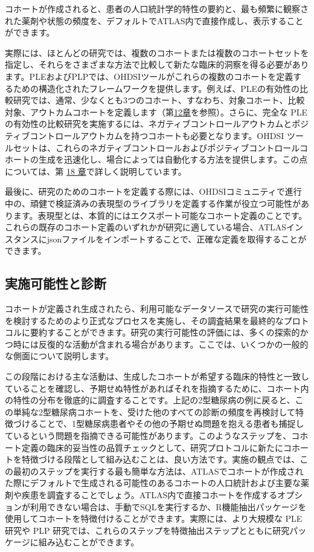 \documentclass[
  11pt]{book}
\theoremstyle{definition}
\theoremstyle{definition}
\theoremstyle{definition}
\theoremstyle{definition}
\theoremstyle{remark}
\begin{document}
コホートが作成されると、患者の人口統計学的特性の要約と、最も頻繁に観察された薬剤や状態の頻度を、デフォルトでATLAS内で直接作成し、表示することができます。

実際には、ほとんどの研究では、複数のコホートまたは複数のコホートセットを指定し、それらをさまざまな方法で比較して新たな臨床的洞察を得る必要があります。PLEおよびPLPでは、OHDSIツールがこれらの複数のコホートを定義するための構造化されたフレームワークを提供します。例えば、PLEの有効性の比較研究では、通常、少なくとも3つのコホート、すなわち、対象コホート、比較対象、アウトカムコホートを定義します（第\href{https://ohdsi.github.io/TheBookOfOhdsi/PopulationLevelEstimation.html\#PopulationLevelEstimation}{12章}を参照）。さらに、完全な PLE の有効性の比較研究を実施するには、ネガティブコントロールアウトカムとポジティブコントロールアウトカムを持つコホートも必要となります。OHDSI ツールセットは、これらのネガティブコントロールおよびポジティブコントロールコホートの生成を迅速化し、場合によっては自動化する方法を提供します。この点については、第 \href{https://ohdsi.github.io/TheBookOfOhdsi/MethodValidity.html\#MethodValidity}{18 章}で詳しく説明しています。

最後に、研究のためのコホートを定義する際には、OHDSIコミュニティで進行中の、頑健で検証済みの表現型のライブラリを定義する作業が役立つ可能性があります。表現型とは、本質的にはエクスポート可能なコホート定義のことです。これらの既存のコホート定義のいずれかが研究に適している場合、ATLASインスタンスにjsonファイルをインポートすることで、正確な定義を取得することができます。

\subsection{実施可能性と診断}\label{Feasibility}

 

コホートが定義され生成されたら、利用可能なデータソースで研究の実行可能性を検討するためのより正式なプロセスを実施し、その調査結果を最終的なプロトコルに要約することができます。研究の実行可能性の評価には、多くの探索的かつ時には反復的な活動が含まれる場合があります。ここでは、いくつかの一般的な側面について説明します。

この段階における主な活動は、生成したコホートが希望する臨床的特性と一致していることを確認し、予期せぬ特性があればそれを指摘するために、コホート内の特性の分布を徹底的に調査することです。上記の2型糖尿病の例に戻ると、この単純な2型糖尿病コホートを、受けた他のすべての診断の頻度を再検討して特徴づけることで、1型糖尿病患者やその他の予期せぬ問題を抱える患者も捕捉しているという問題を指摘できる可能性があります。このようなステップを、コホート定義の臨床的妥当性の品質チェックとして、研究プロトコルに新たにコホートを特徴づける段階として組み込むことは、良い方法です。実施の観点では、この最初のステップを実行する最も簡単な方法は、ATLASでコホートが作成された際にデフォルトで生成される可能性のあるコホートの人口統計および主要な薬剤や疾患を調査することでしょう。ATLAS内で直接コホートを作成するオプションが利用できない場合は、手動でSQLを実行するか、R機能抽出パッケージを使用してコホートを特徴付けることができます。実際には、より大規模な PLE 研究や PLP 研究では、これらのステップを特徴抽出ステップとともに研究パッケージに組み込むことができます。
\end{document}
